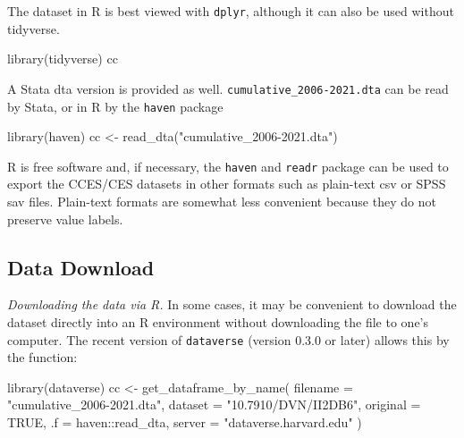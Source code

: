 \documentclass[10pt,article,oneside]{memoir}
\theoremstyle{definition}
\newenvironment{Shaded}{\begin{snugshade}}{\end{snugshade}}
\newcommand{\AttributeTok}[1]{\textcolor[rgb]{0.77,0.63,0.00}{#1}}
\newcommand{\ConstantTok}[1]{\textcolor[rgb]{0.00,0.00,0.00}{#1}}
\newcommand{\FunctionTok}[1]{\textcolor[rgb]{0.00,0.00,0.00}{#1}}
\newcommand{\NormalTok}[1]{#1}
\newcommand{\OtherTok}[1]{\textcolor[rgb]{0.56,0.35,0.01}{#1}}
\newcommand{\SpecialCharTok}[1]{\textcolor[rgb]{0.00,0.00,0.00}{#1}}
\newcommand{\StringTok}[1]{\textcolor[rgb]{0.31,0.60,0.02}{#1}}
\begin{document}
\noindent The dataset in R is best viewed with \texttt{dplyr}, although
it can also be used without tidyverse.

\begin{Shaded}
\begin{Highlighting}[]
\FunctionTok{library}\NormalTok{(tidyverse)}
\NormalTok{cc}
\end{Highlighting}
\end{Shaded}

\noindent  A Stata dta version is provided as well.
\texttt{cumulative\_2006-2021.dta} can be read by Stata, or in R by the
\texttt{haven} package

\begin{Shaded}
\begin{Highlighting}[]
\FunctionTok{library}\NormalTok{(haven)}
\NormalTok{cc }\OtherTok{\textless{}{-}} \FunctionTok{read\_dta}\NormalTok{(}\StringTok{"cumulative\_2006{-}2021.dta"}\NormalTok{)}
\end{Highlighting}
\end{Shaded}

R is free software and, if necessary, the \texttt{haven} and
\texttt{readr} package can be used to export the CCES/CES datasets in
other formats such as plain-text csv or SPSS sav files. Plain-text
formats are somewhat less convenient because they do not preserve value
labels.

\hypertarget{data-download}{%
\subsection{Data Download}\label{data-download}}

\noindent \emph{Downloading the data via R.} In some cases, it may be
convenient to download the dataset directly into an R environment
without downloading the file to one's computer. The recent version of
\texttt{dataverse} (version 0.3.0 or later) allows this by the function:

\begin{Shaded}
\begin{Highlighting}[]
\FunctionTok{library}\NormalTok{(dataverse)}
\NormalTok{cc }\OtherTok{\textless{}{-}} \FunctionTok{get\_dataframe\_by\_name}\NormalTok{(}
  \AttributeTok{filename =} \StringTok{"cumulative\_2006{-}2021.dta"}\NormalTok{,}
  \AttributeTok{dataset =} \StringTok{"10.7910/DVN/II2DB6"}\NormalTok{,}
  \AttributeTok{original =} \ConstantTok{TRUE}\NormalTok{,}
  \AttributeTok{.f =}\NormalTok{ haven}\SpecialCharTok{::}\NormalTok{read\_dta,}
  \AttributeTok{server =} \StringTok{"dataverse.harvard.edu"}
\NormalTok{)}
\end{Highlighting}
\end{Shaded}
\end{document}
